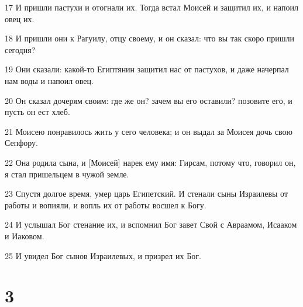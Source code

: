 \par 17 И пришли пастухи и отогнали их. Тогда встал Моисей и защитил их, и напоил овец их.
\par 18 И пришли они к Рагуилу, отцу своему, и он сказал: что вы так скоро пришли сегодня?
\par 19 Они сказали: какой-то Египтянин защитил нас от пастухов, и даже начерпал нам воды и напоил овец.
\par 20 Он сказал дочерям своим: где же он? зачем вы его оставили? позовите его, и пусть он ест хлеб.
\par 21 Моисею понравилось жить у сего человека; и он выдал за Моисея дочь свою Сепфору.
\par 22 Она родила сына, и [Моисей] нарек ему имя: Гирсам, потому что, говорил он, я стал пришельцем в чужой земле.
\par 23 Спустя долгое время, умер царь Египетский. И стенали сыны Израилевы от работы и вопияли, и вопль их от работы восшел к Богу.
\par 24 И услышал Бог стенание их, и вспомнил Бог завет Свой с Авраамом, Исааком и Иаковом.
\par 25 И увидел Бог сынов Израилевых, и призрел их Бог.

\chapter{3}

